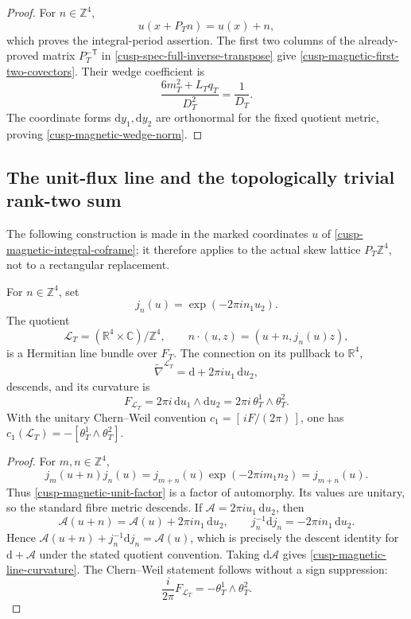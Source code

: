 \begin{proof}
For \(n\in\mathbb Z^4\),
\[
 u(x+P_Tn)=u(x)+n,
\]
which proves the integral-period assertion.  The first two columns of the
already-proved matrix \(P_T^{-\mathsf T}\) in
\cref{cusp-spec-full-inverse-transpose} give
\cref{cusp-magnetic-first-two-covectors}.  Their wedge coefficient is
\[
 \frac{6m_T^2+L_Tq_T}{D_T^2}=\frac1{D_T}.
\]
The coordinate forms \(\mathrm dy_1,\mathrm dy_2\) are orthonormal for the fixed quotient
metric, proving \cref{cusp-magnetic-wedge-norm}.
\end{proof}

\subsection{The unit-flux line and the topologically trivial rank-two sum}

The following construction is made in the marked coordinates \(u\) of
\eqref{cusp-magnetic-integral-coframe}; it therefore applies to the actual
skew lattice \(P_T\mathbb Z^4\), not to a rectangular replacement.

\begin{proposition}
\label{cusp-magnetic-line-bundle-proposition}
For \(n\in\mathbb Z^4\), set
\begin{equation}
 j_n(u)=\exp(-2\pi i n_1u_2).
 \label{cusp-magnetic-unit-factor}
\end{equation}
The quotient
\[
 \mathscr L_T=(\mathbb R^4\times\mathbb C)/\mathbb Z^4,
 \qquad
 n\cdot(u,z)=(u+n,j_n(u)z),
\]
is a Hermitian line bundle over \(F_T\).  The connection on its pullback
to \(\mathbb R^4\),
\begin{equation}
 \widetilde\nabla^{\mathscr L_T}
 =\mathrm d+2\pi i u_1\,\mathrm du_2,
 \label{cusp-magnetic-line-connection}
\end{equation}
descends, and its curvature is
\begin{equation}
 F_{\mathscr L_T}=2\pi i\,\mathrm du_1\wedge\mathrm du_2
        =2\pi i\,\theta_T^1\wedge\theta_T^2.
 \label{cusp-magnetic-line-curvature}
\end{equation}
With the unitary Chern--Weil convention
\(c_1=[\,iF/(2\pi)\,]\), one has
\(c_1(\mathscr L_T)=-[\theta_T^1\wedge\theta_T^2]\).
\end{proposition}

\begin{proof}
For \(m,n\in\mathbb Z^4\),
\[
 j_m(u+n)j_n(u)
 =j_{m+n}(u)\exp(-2\pi i m_1n_2)
 =j_{m+n}(u).
\]
Thus \eqref{cusp-magnetic-unit-factor} is a factor of automorphy.  Its
values are unitary, so the standard fibre metric descends.  If
\(\mathcal A=2\pi i u_1\,\mathrm du_2\), then
\[
 \mathcal A(u+n)=\mathcal A(u)+2\pi i n_1\,\mathrm du_2,
 \qquad
 j_n^{-1}\mathrm dj_n=-2\pi i n_1\,\mathrm du_2.
\]
Hence \(\mathcal A(u+n)+j_n^{-1}\mathrm dj_n=\mathcal A(u)\), which is precisely
the descent identity for \(\mathrm d+\mathcal A\) under the stated quotient
convention.  Taking \(\mathrm d\mathcal A\) gives
\eqref{cusp-magnetic-line-curvature}.  The Chern--Weil statement follows
without a sign suppression:
\[
 \frac{i}{2\pi}F_{\mathscr L_T}=-\theta_T^1\wedge\theta_T^2.
\]
\end{proof}

